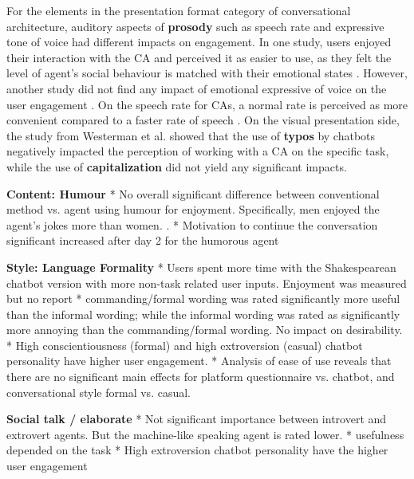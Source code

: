 \documentclass[sigconf,screen,review, anonymous]{acmart}
\newcommand{\cmt}[1]{}%
\begin{document}
For the elements in the presentation format category of conversational architecture, auditory aspects of \textbf{prosody} such as speech rate and expressive tone of voice had different impacts on engagement. In one study, users enjoyed their interaction with the CA and perceived it as easier to use, as they felt the level of agent's social behaviour is matched with their emotional states \cite{kim2020can}\cmt{[24]}. However, another study did not find any impact of emotional expressive of voice on the user engagement \cite{zhu2022effects}\cmt{[26]}. On the speech rate for CAs, a normal rate is perceived as more convenient compared to a faster rate of speech \cite{choi2020nobody}\cmt{[54]}. On the visual presentation side, the study from Westerman et al. \cite{westerman2019believe}\cmt{[9]} showed that the use of \textbf{typos} by chatbots negatively impacted the perception of working with a CA on the specific task, while the use of \textbf{capitalization} did not yield any significant impacts.

\textbf{Content: Humour}
* No overall significant difference between conventional method vs. agent using humour for enjoyment. Specifically, men enjoyed the agent's jokes more than women.  \cite{miyamoto2017improving}\cmt{[46]}.
* Motivation to continue the conversation significant increased after day 2 for the humorous agent \cite{go2021conversational}\cmt{[80]}

\textbf{Style: Language Formality}
* Users spent more time with the Shakespearean chatbot version with more non-task related user inputs. Enjoyment was measured but no report \cite{elsholz2019exploring}\cmt{[61]}
* commanding/formal wording was rated significantly more useful than the informal wording; while the informal wording was rated as significantly more annoying than the commanding/formal wording. No impact on desirability. \cite{jestin2022effects}\cmt{[81]}
* High conscientiousness (formal) and high extroversion (casual) chatbot personality have higher user engagement. \cite{moilanen2022measuring}\cmt{[82]}
* Analysis of ease of use reveals that there are no significant main effects for platform questionnaire vs. chatbot, and conversational style formal vs. casual.\cite{kim2019comparing}\cmt{[89]}

\textbf{Social talk / elaborate}
* Not significant importance between introvert and extrovert agents. But the machine-like speaking agent is rated lower. \cite{roy2021users}\cmt{[71]}
* usefulness depended on the task \cite{haas2022keep}\cmt{[78]}
* High extroversion chatbot personality have the higher user engagement \cite{moilanen2022measuring}\cmt{[82]}
\end{document}
